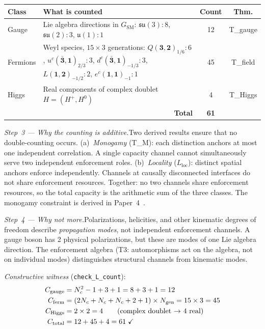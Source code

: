 \documentclass[11pt]{article}
\newcommand{\Ctot}{C_{\mathrm{total}}}
\newcommand{\Ngen}{N_{\mathrm{gen}}}
\newcommand{\Lloc}{L_{\mathrm{loc}}}
\begin{document}
\smallskip
\begin{center}
\small
\begin{tabular}{p{1.5cm}p{7cm}cc}
\toprule
\textbf{Class} & \textbf{What is counted} & \textbf{Count} & \textbf{Thm.} \\
\midrule
Gauge & Lie algebra directions in $G_{\mathrm{SM}}$: $\mathfrak{su}(3)\!: 8$,\; $\mathfrak{su}(2)\!: 3$,\; $\mathfrak{u}(1)\!: 1$ & 12 & T\_gauge \\[4pt]
Fermions & Weyl species, $15 \times 3$ generations: $Q(\mathbf{3},\mathbf{2})_{1/6}\!: 6$,\; $u^c(\bar{\mathbf{3}},\mathbf{1})_{2/3}\!: 3$,\; $d^c(\bar{\mathbf{3}},\mathbf{1})_{-1/3}\!: 3$,\; $L(\mathbf{1},\mathbf{2})_{-1/2}\!: 2$,\; $e^c(\mathbf{1},\mathbf{1})_{-1}\!: 1$ & 45 & T\_field \\[4pt]
Higgs & Real components of complex doublet $H = (H^+, H^0)$ & 4 & T\_Higgs \\
\midrule
\multicolumn{2}{r}{\textbf{Total}} & \textbf{61} & \\
\bottomrule
\end{tabular}
\end{center}
\smallskip

\textit{Step~3 --- Why the counting is additive.}\quad Two derived results ensure that no double-counting occurs.  (a)~\emph{Monogamy} (T\_M): each distinction anchors at most one independent correlation.  A single capacity channel cannot simultaneously serve two independent enforcement roles.  (b)~\emph{Locality} ($\Lloc$): distinct spatial anchors enforce independently.  Channels at causally disconnected interfaces do not share enforcement resources.  Together: no two channels share enforcement resources, so the total capacity is the arithmetic sum of the three classes.  The monogamy constraint is derived in Paper~4~\cite{P4}.

\textit{Step~4 --- Why not more.}\quad Polarizations, helicities, and other kinematic degrees of freedom describe \emph{propagation modes}, not independent enforcement channels.  A gauge boson has 2 physical polarizations, but these are modes of one Lie algebra direction.  The enforcement algebra (T3: automorphisms act on the algebra, not on individual modes) distinguishes structural channels from kinematic modes.

\textit{Constructive witness} (\texttt{check\_L\_count}):
\begin{align}
C_{\mathrm{gauge}} &= N_c^2 - 1 + 3 + 1 = 8 + 3 + 1 = 12 \notag\\
C_{\mathrm{ferm}} &= (2N_c + N_c + N_c + 2 + 1) \times \Ngen = 15 \times 3 = 45 \notag\\
C_{\mathrm{Higgs}} &= 2 \times 2 = 4 \qquad\text{(complex doublet $\to$ 4 real)} \notag\\
\Ctot &= 12 + 45 + 4 = 61\;\checkmark
\end{align}
\end{document}
